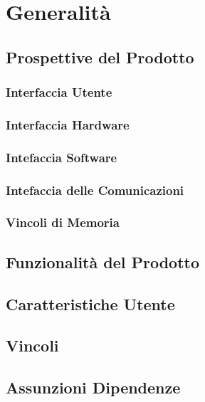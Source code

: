 \chapter{Generalit\`a}
\section{Prospettive del Prodotto}
\subsection{Interfaccia Utente}
\subsection{Interfaccia Hardware}
\subsection{Intefaccia Software}
\subsection{Intefaccia delle Comunicazioni}
\subsection{Vincoli di Memoria}
\section{Funzionalit\`a del Prodotto}
\section{Caratteristiche Utente}
\section{Vincoli}
\section{Assunzioni Dipendenze}
